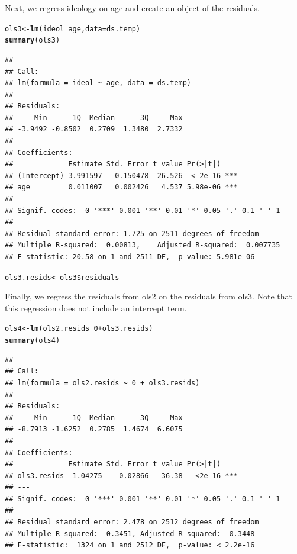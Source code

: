 \documentclass[11pt,openany]{book}\usepackage[]{graphicx}\usepackage[]{color}
\makeatletter
\newcommand{\hlnum}[1]{\textcolor[rgb]{0.686,0.059,0.569}{#1}}%
\newcommand{\hlopt}[1]{\textcolor[rgb]{0,0,0}{#1}}%
\newcommand{\hlstd}[1]{\textcolor[rgb]{0.345,0.345,0.345}{#1}}%
\newcommand{\hlkwb}[1]{\textcolor[rgb]{0.69,0.353,0.396}{#1}}%
\newcommand{\hlkwc}[1]{\textcolor[rgb]{0.333,0.667,0.333}{#1}}%
\newcommand{\hlkwd}[1]{\textcolor[rgb]{0.737,0.353,0.396}{\textbf{#1}}}%
\newenvironment{kframe}{%
 \def\at@end@of@kframe{}%
 \ifinner\ifhmode%
  \def\at@end@of@kframe{\end{minipage}}%
  \begin{minipage}{\columnwidth}%
 \fi\fi%
 \def\FrameCommand##1{\hskip\@totalleftmargin \hskip-\fboxsep
 \colorbox{shadecolor}{##1}\hskip-\fboxsep
     \hskip-\linewidth \hskip-\@totalleftmargin \hskip\columnwidth}%
 \MakeFramed {\advance\hsize-\width
   \@totalleftmargin\z@ \linewidth\hsize
   \@setminipage}}%
 {\par\unskip\endMakeFramed%
 \at@end@of@kframe}
\newenvironment{knitrout}{}{} %
\renewenvironment{knitrout}{\begin{singlespace}}{\end{singlespace}}
\makeatother
\begin{document}
\noindent Next, we regress ideology on age and create an object of the residuals. 
\begin{knitrout}
\color{fgcolor}\begin{kframe}
\begin{alltt}
\hlstd{ols3} \hlkwb{<-} \hlkwd{lm}\hlstd{(ideol} \hlopt{~} \hlstd{age,} \hlkwc{data} \hlstd{= ds.temp)}
\hlkwd{summary}\hlstd{(ols3)}
\end{alltt}
\begin{verbatim}
## 
## Call:
## lm(formula = ideol ~ age, data = ds.temp)
## 
## Residuals:
##     Min      1Q  Median      3Q     Max 
## -3.9492 -0.8502  0.2709  1.3480  2.7332 
## 
## Coefficients:
##             Estimate Std. Error t value Pr(>|t|)    
## (Intercept) 3.991597   0.150478  26.526  < 2e-16 ***
## age         0.011007   0.002426   4.537 5.98e-06 ***
## ---
## Signif. codes:  0 '***' 0.001 '**' 0.01 '*' 0.05 '.' 0.1 ' ' 1
## 
## Residual standard error: 1.725 on 2511 degrees of freedom
## Multiple R-squared:  0.00813,	Adjusted R-squared:  0.007735 
## F-statistic: 20.58 on 1 and 2511 DF,  p-value: 5.981e-06
\end{verbatim}
\begin{alltt}
\hlstd{ols3.resids} \hlkwb{<-} \hlstd{ols3}\hlopt{\$}\hlstd{residuals}
\end{alltt}
\end{kframe}
\end{knitrout}

\noindent Finally, we regress the residuals from ols2 on the residuals from ols3. Note that this regression does not include an intercept term. 
\begin{knitrout}
\color{fgcolor}\begin{kframe}
\begin{alltt}
\hlstd{ols4} \hlkwb{<-} \hlkwd{lm}\hlstd{(ols2.resids} \hlopt{~} \hlnum{0} \hlopt{+} \hlstd{ols3.resids)}
\hlkwd{summary}\hlstd{(ols4)}
\end{alltt}
\begin{verbatim}
## 
## Call:
## lm(formula = ols2.resids ~ 0 + ols3.resids)
## 
## Residuals:
##     Min      1Q  Median      3Q     Max 
## -8.7913 -1.6252  0.2785  1.4674  6.6075 
## 
## Coefficients:
##             Estimate Std. Error t value Pr(>|t|)    
## ols3.resids -1.04275    0.02866  -36.38   <2e-16 ***
## ---
## Signif. codes:  0 '***' 0.001 '**' 0.01 '*' 0.05 '.' 0.1 ' ' 1
## 
## Residual standard error: 2.478 on 2512 degrees of freedom
## Multiple R-squared:  0.3451,	Adjusted R-squared:  0.3448 
## F-statistic:  1324 on 1 and 2512 DF,  p-value: < 2.2e-16
\end{verbatim}
\end{kframe}
\end{knitrout}
\end{document}
